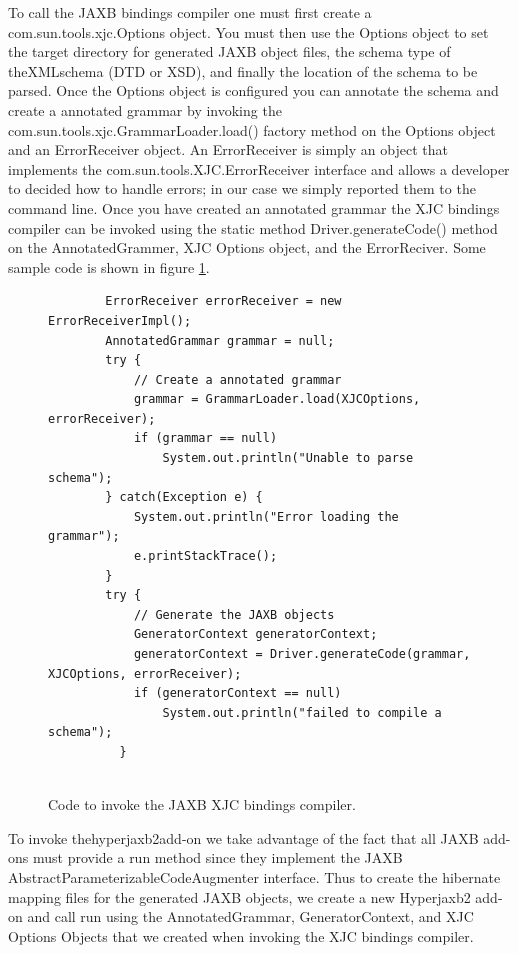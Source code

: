 To call the JAXB bindings compiler one must first create a com.sun.tools.xjc.Options object.  You must then use the Options object to set the target directory for generated JAXB object files, the schema type of theXMLschema (DTD or XSD), and finally the location of the schema to be parsed.  Once the Options object is configured you can annotate the schema and create a annotated grammar by invoking the com.sun.tools.xjc.GrammarLoader.load()  factory method on the Options object and an ErrorReceiver object.  An ErrorReceiver is simply an object that implements the com.sun.tools.XJC.ErrorReceiver interface and allows a developer to decided how to handle errors;  in our case we simply reported them to the command line.   Once you have created an annotated grammar the XJC bindings compiler can be invoked using the static method Driver.generateCode() method on the AnnotatedGrammer, XJC Options object, and the ErrorReciver.  Some sample code is shown in figure \ref{XJCsamplecode}.
\begin{figure}[htbp]
\begin{center}
\begin{verbatim}     
        ErrorReceiver errorReceiver = new ErrorReceiverImpl();
        AnnotatedGrammar grammar = null;
        try {
            // Create a annotated grammar
            grammar = GrammarLoader.load(XJCOptions, errorReceiver);
            if (grammar == null)
                System.out.println("Unable to parse schema");
        } catch(Exception e) {
            System.out.println("Error loading the grammar");
            e.printStackTrace(); 
        }
        try {
            // Generate the JAXB objects
            GeneratorContext generatorContext;
            generatorContext = Driver.generateCode(grammar, XJCOptions, errorReceiver);
            if (generatorContext == null)
                System.out.println("failed to compile a schema");
          }
        
\end{verbatim}

\caption{Code to invoke the JAXB XJC bindings compiler.}
\label{XJCsamplecode}
\end{center}
\end{figure}

To invoke thehyperjaxb2add-on we take advantage of the fact that all JAXB add-ons must provide a run method since they implement the JAXB AbstractParameterizableCodeAugmenter interface.  Thus to create the hibernate mapping files for the generated JAXB objects, we create a new Hyperjaxb2 add-on and call run using the AnnotatedGrammar, GeneratorContext,  and XJC Options Objects that we created when invoking the XJC bindings compiler. 

